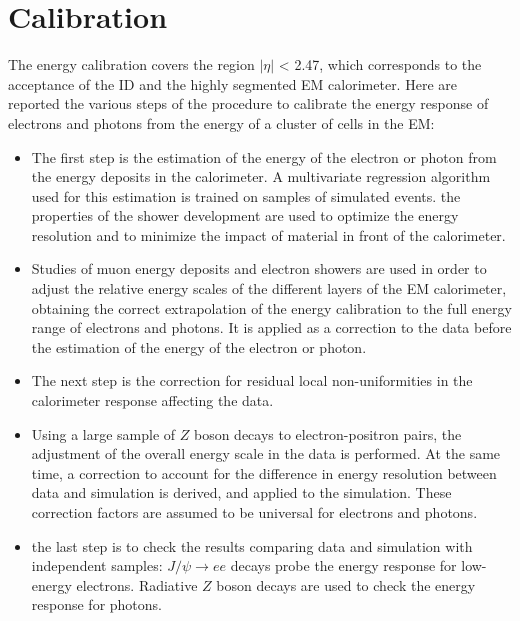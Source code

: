 \documentclass[a4paper, oneside, 11pt, openright]{book}
\begin{document}
		\section{Calibration}\label{section:Calib}
			The energy calibration \cite{calibration} covers the region $|\eta|$ < 2.47, which corresponds to the acceptance of the ID and the highly segmented EM calorimeter. Here are reported the various steps of the procedure to calibrate the energy response of electrons and photons from the energy of a cluster of cells in the EM:
			\begin{itemize}
				\item The first step is the estimation of the energy of the electron or photon from the energy deposits in the calorimeter. A multivariate regression algorithm used for this estimation is trained on samples of simulated events. the properties of the shower development are used to optimize the energy resolution and to minimize the impact of material in front of the calorimeter.
				\item Studies of muon energy deposits and electron showers are used in order to adjust the relative energy scales of the different layers of the EM calorimeter, obtaining the correct extrapolation of the energy calibration to the full energy range of electrons and photons. It is applied as a correction to the data before the estimation of the energy of the electron or photon.
				\item The next step is the correction for residual local non-uniformities in the calorimeter response affecting the data.
				\item Using a large sample of $Z$ boson decays to electron-positron pairs, the adjustment of the overall energy scale in the data is performed. At the same time, a correction to account for the difference in energy resolution between data and simulation is derived, and applied to the simulation. These correction factors are assumed to be universal for electrons and photons.
				\item the last step is to check the results comparing data and simulation with independent samples: $J/\psi \rightarrow ee$ decays probe the energy response for low-energy electrons. Radiative $Z$ boson decays are used to check the energy response for photons.
			\end{itemize}
		
\end{document}
